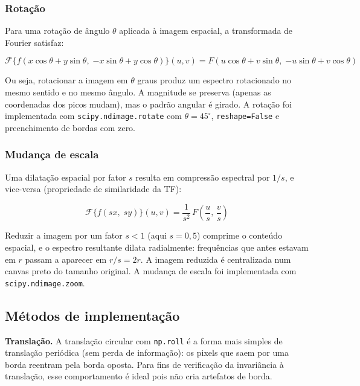 \documentclass[12pt,a4paper]{article}
\newcommand{\campo}[2]{\textbf{#1.} #2\par}
\begin{document}
\subsubsection*{Rotação}

Para uma rotação de ângulo $\theta$ aplicada à imagem espacial, a transformada de
Fourier satisfaz:

\begin{equation}
  \mathcal{F}\{f(x\cos\theta + y\sin\theta,\; {-x}\sin\theta + y\cos\theta)\}(u,v)
  = F(u\cos\theta + v\sin\theta,\; {-u}\sin\theta + v\cos\theta)
  \label{eq:rotacao}
\end{equation}

Ou seja, rotacionar a imagem em $\theta$ graus produz um espectro rotacionado no
mesmo sentido e no mesmo ângulo. A magnitude se preserva (apenas as coordenadas dos
picos mudam), mas o padrão angular é girado. A rotação foi implementada com
\texttt{scipy.ndimage.rotate} com $\theta = 45^\circ$, \texttt{reshape=False} e
preenchimento de bordas com zero.

\subsubsection*{Mudança de escala}

Uma dilatação espacial por fator $s$ resulta em compressão espectral por $1/s$, e
vice-versa (propriedade de similaridade da TF):

\begin{equation}
  \mathcal{F}\{f(sx,\; sy)\}(u,v)
  = \frac{1}{s^2}\,F\!\left(\frac{u}{s},\, \frac{v}{s}\right)
  \label{eq:escala}
\end{equation}

Reduzir a imagem por um fator $s < 1$ (aqui $s = 0{,}5$) comprime o conteúdo
espacial, e o espectro resultante dilata radialmente: frequências que antes estavam
em $r$ passam a aparecer em $r/s = 2r$. A imagem reduzida é centralizada num canvas
preto do tamanho original. A mudança de escala foi implementada com
\texttt{scipy.ndimage.zoom}.

\subsection{Métodos de implementação}

\campo{Translação}{A translação circular com \texttt{np.roll} é a forma mais simples
de translação periódica (sem perda de informação): os pixels que saem por uma borda
reentram pela borda oposta. Para fins de verificação da invariância à translação,
esse comportamento é ideal pois não cria artefatos de borda.}
\end{document}
